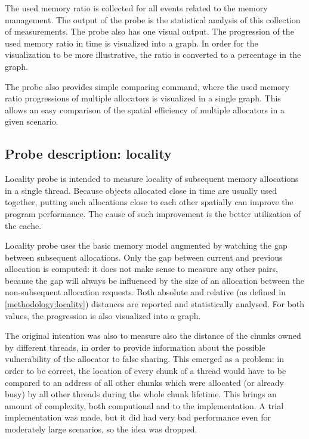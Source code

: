 The used memory ratio is collected for all events related to the memory management. The output of the probe is the statistical analysis of this collection of measurements. The probe also has one visual output. The progression of the used memory ratio in time is visualized into a graph. In order for the visualization to be more illustrative, the ratio is converted to a percentage in the graph.

The probe also provides simple comparing command, where the used memory ratio progressions of multiple allocators is visualized in a single graph. This allows an easy comparison of the spatial efficiency of multiple allocators in a given scenario.

\subsection{Probe description: locality}

Locality probe is intended to measure locality of subsequent memory allocations in a single thread. Because objects allocated close in time are usually used together, putting such allocations close to each other spatially can improve the program performance. The cause of such improvement is the better utilization of the cache.

Locality probe uses the basic memory model augmented by watching the gap between subsequent allocations. Only the gap between current and previous allocation is computed: it does not make sense to measure any other pairs, because the gap will always be influenced by the size of an allocation between the non-subsequent allocation requests. Both absolute and relative (as defined in \ref{methodology:locality}) distances are reported and statistically analysed. For both values, the progression is also visualized into a graph.

The original intention was also to measure also the distance of the chunks owned by different threads, in order to provide information about the possible vulnerability of the allocator to false sharing. This emerged as a problem: in order to be correct, the location of every chunk of a thread would have to be compared to an address of all other chunks which were allocated (or already busy) by all other threads during the whole chunk lifetime. This brings an amount of complexity, both computional and to the implementation. A trial implementation was made, but it did had very bad performance even for moderately large scenarios, so the idea was dropped.

